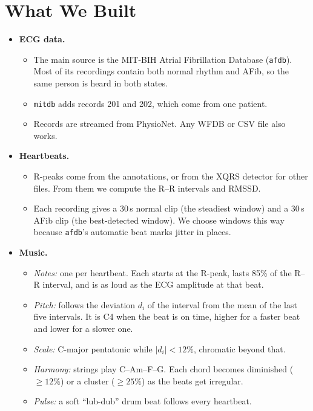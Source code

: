 \documentclass[11pt,a4paper]{article}
\begin{document}
\section{What We Built}
\begin{itemize}
  \item \textbf{ECG data.}
    \begin{itemize}
      \item The main source is the MIT-BIH Atrial Fibrillation Database (\texttt{afdb}). Most of
        its recordings contain both normal rhythm and AFib, so the same person is heard in both
        states.
      \item \texttt{mitdb} adds records 201 and 202, which come from one patient.
      \item Records are streamed from PhysioNet. Any WFDB or CSV file also works.
    \end{itemize}
  \item \textbf{Heartbeats.}
    \begin{itemize}
      \item R-peaks come from the annotations, or from the XQRS detector for other files. From
        them we compute the R--R intervals and RMSSD.
      \item Each recording gives a 30\,s normal clip (the steadiest window) and a 30\,s AFib clip
        (the best-detected window). We choose windows this way because \texttt{afdb}'s automatic
        beat marks jitter in places.
    \end{itemize}
  \item \textbf{Music.}
    \begin{itemize}
      \item \emph{Notes:} one per heartbeat. Each starts at the R-peak, lasts 85\% of the R--R
        interval, and is as loud as the ECG amplitude at that beat.
      \item \emph{Pitch:} follows the deviation $d_i$ of the interval from the mean of the last
        five intervals. It is C4 when the beat is on time, higher for a faster beat and lower
        for a slower one.
      \item \emph{Scale:} C-major pentatonic while $|d_i|<12\%$, chromatic beyond that.
      \item \emph{Harmony:} strings play C--Am--F--G. Each chord becomes diminished
        ($\geq 12\%$) or a cluster ($\geq 25\%$) as the beats get irregular.
      \item \emph{Pulse:} a soft ``lub-dub'' drum beat follows every heartbeat.
    \end{itemize}

\end{itemize}
\end{document}
